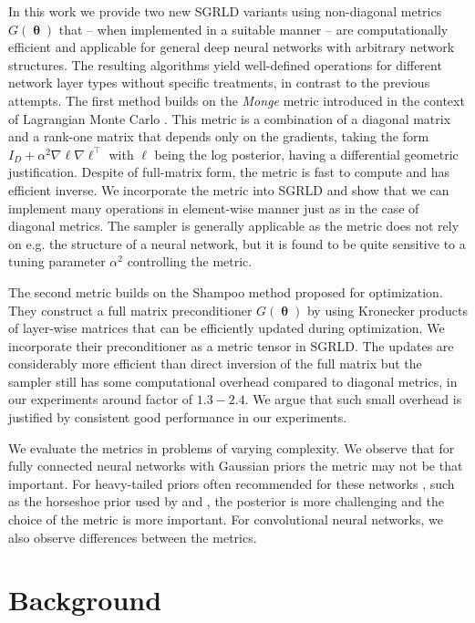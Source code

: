 \documentclass[10pt]{article} %
\DeclareMathOperator{\btheta}{\boldsymbol{\theta}}
\theoremstyle{plain}
\theoremstyle{definition}
\theoremstyle{remark}
\begin{document}
In this work we provide two new SGRLD variants using non-diagonal metrics $G(\btheta)$ that -- when implemented in a suitable manner -- are computationally efficient and applicable for general deep neural networks with arbitrary network structures. The resulting algorithms yield well-defined operations for different network layer types without specific treatments, in contrast to the previous attempts.
The first method builds on the \emph{Monge} metric \cite{Hartmann2022} introduced in the context of Lagrangian Monte Carlo \citep{Lan2015}. This metric is a combination of a diagonal matrix and a rank-one matrix that depends only on the gradients, taking the form $I_{D}+\alpha^{2}\nabla \ell\nabla \ell^{\top}$ with $\ell$ being the log posterior, having a differential geometric justification. Despite of full-matrix form, the metric is fast to compute and has efficient inverse. 
We incorporate the metric into SGRLD and show that we can implement many operations in element-wise manner just as in the case of diagonal metrics.
The sampler is  generally applicable as the metric does not rely on e.g. the structure of a neural network, but it is found to be quite sensitive to a tuning parameter $\alpha^{2}$ controlling the metric.

The second metric builds on the Shampoo method \citet{Gupta2018} proposed for optimization. They construct a full matrix preconditioner $G(\btheta)$ by using Kronecker products of layer-wise matrices that can be efficiently updated during optimization. We incorporate their preconditioner as a metric tensor in SGRLD. The updates are considerably more efficient than direct inversion of the full matrix but the sampler still has some computational overhead compared to diagonal metrics,
in our experiments around factor of $1.3-2.4$. We argue that such small overhead is justified by consistent good performance in our experiments.

We evaluate the metrics in problems of varying complexity. We observe that for fully connected neural networks with Gaussian priors the metric may not be that important. For heavy-tailed priors often recommended for these networks \citep{Fortuin2022}, such as the horseshoe prior \citep{Carvalho2009} used by \citet{Ghosh2019} and \citet{Popkes2019}, the posterior is more challenging and the choice of the metric is more important. For convolutional neural networks, we also observe differences between the metrics.

\section{Background}
\label{sec:background}
\end{document}
